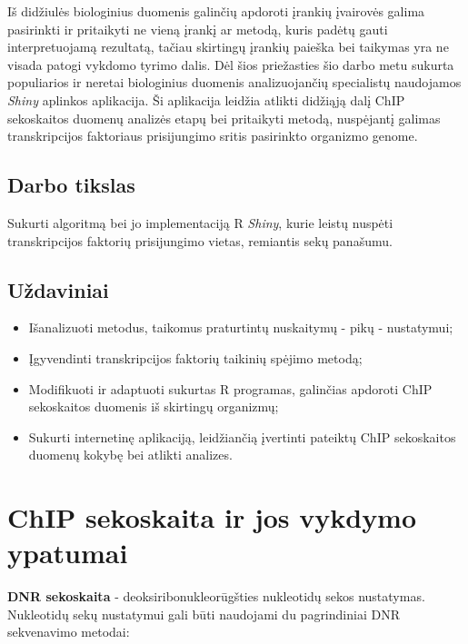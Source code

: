\documentclass[12pt]{article}
\begin{document}
Iš didžiulės biologinius duomenis galinčių apdoroti įrankių įvairovės galima
pasirinkti ir pritaikyti ne vieną įrankį ar metodą, kuris padėtų gauti
interpretuojamą rezultatą, tačiau skirtingų įrankių paieška bei taikymas yra ne
visada patogi vykdomo tyrimo dalis. Dėl šios priežasties šio darbo metu
sukurta populiarios ir neretai biologinius duomenis analizuojančių specialistų
naudojamos \emph{Shiny} aplinkos aplikacija. Ši aplikacija leidžia atlikti
didžiąją dalį ChIP sekoskaitos duomenų analizės etapų bei pritaikyti metodą,
nuspėjantį galimas transkripcijos faktoriaus prisijungimo sritis pasirinkto 
organizmo genome.

\subsection*{Darbo tikslas}
Sukurti algoritmą bei jo implementaciją R \emph{Shiny}, kurie leistų nuspėti
transkripcijos faktorių prisijungimo vietas, remiantis sekų panašumu.

\subsection*{Uždaviniai}
\begin{itemize}
    \item Išanalizuoti metodus, taikomus praturtintų nuskaitymų - pikų -
          nustatymui;
    \item Įgyvendinti transkripcijos faktorių taikinių spėjimo metodą;
    \item Modifikuoti ir adaptuoti sukurtas R programas, galinčias apdoroti
          ChIP sekoskaitos duomenis iš skirtingų organizmų;          
    \item Sukurti internetinę aplikaciją, leidžiančią įvertinti pateiktų
          ChIP sekoskaitos duomenų kokybę bei atlikti analizes.

\end{itemize}

\newpage


\section{ChIP sekoskaita ir jos vykdymo ypatumai}

\textbf{DNR sekoskaita} - deoksiribonukleorūgšties nukleotidų sekos nustatymas.
Nukleotidų sekų nustatymui gali būti naudojami du pagrindiniai DNR sekvenavimo 
metodai:
\end{document}
